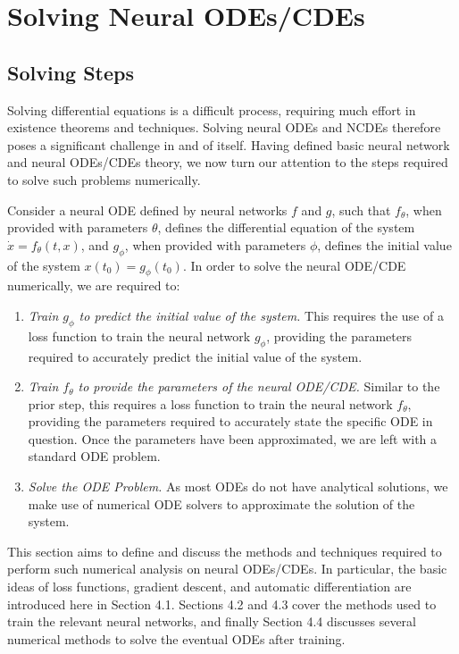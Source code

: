 \documentclass[a4paper,11pt, titlepage]{article}
\theoremstyle{definition}
\theoremstyle{plain}
\theoremstyle{remark}
\begin{document}
\section{Solving Neural ODEs/CDEs}

\subsection{Solving Steps}

Solving differential equations is a difficult process, requiring much effort in existence theorems and techniques. Solving neural ODEs and NCDEs therefore poses a significant challenge in and of itself. Having defined basic neural network and neural ODEs/CDEs theory, we now turn our attention to the steps required to solve such problems numerically.

Consider a neural ODE defined by neural networks $f$ and $g$, such that $f_\theta$, when provided with parameters $\theta$, defines the differential equation of the system $\dot{x} = f_\theta\left(t, x\right)$, and $g_\phi$, when provided with parameters $\phi$, defines the initial value of the system $x\left(t_0\right) = g_\phi(t_0)$. In order to solve the neural ODE/CDE numerically, we are required to:

\begin{enumerate}
    \item \textit{Train $g_\phi$ to predict the initial value of the system.} This requires the use of a loss function to train the neural network $g_\phi$, providing the parameters required to accurately predict the initial value of the system. 
    \item \textit{Train $f_\theta$ to provide the parameters of the neural ODE/CDE.} Similar to the prior step, this requires a loss function to train the neural network $f_\theta$, providing the parameters required to accurately state the specific ODE in question. Once the parameters have been approximated, we are left with a standard ODE problem.
    \item \textit{Solve the ODE Problem.} As most ODEs do not have analytical solutions, we make use of numerical ODE solvers to approximate the solution of the system.
\end{enumerate}

This section aims to define and discuss the methods and techniques required to perform such numerical analysis on neural ODEs/CDEs. In particular, the basic ideas of loss functions, gradient descent, and automatic differentiation are introduced here in Section 4.1. Sections 4.2 and 4.3 cover the methods used to train the relevant neural networks, and finally Section 4.4 discusses several numerical methods to solve the eventual ODEs after training.
\end{document}
